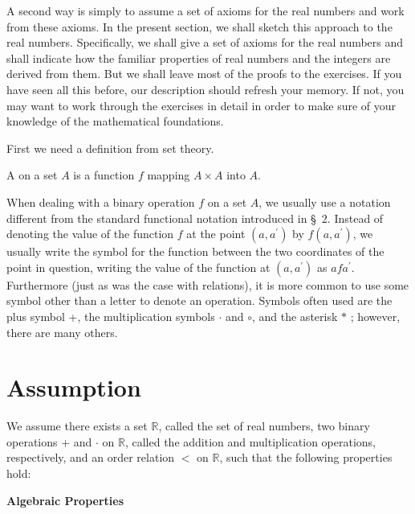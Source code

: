 A second way is simply to assume a set of axioms for the real numbers and 
work from these axioms. In the present section, we shall sketch this approach 
to the real numbers. Specifically, we shall give a set of axioms for the real 
numbers and shall indicate how the familiar properties of real numbers 
and the integers are derived from them. But we shall leave most of the proofs 
to the exercises. If you have seen all this before, our description should 
refresh your memory. If not, you may want to work through the exercises in 
detail in order to make sure of your knowledge of the mathematical foundations.

First we need a definition from set theory.

\begin{definition}
 A  on a set \(A\) is a function \(f\) mapping \(A \times A\) into \(A\).
\end{definition}

When dealing with a binary operation \(f\) on a set \(A\), 
we usually use a notation different from the standard functional notation 
introduced in \S\ 2. Instead of denoting the value of the function \(f\) 
at the point \(({a,a^{\prime }})\) by \(f({a,a^{\prime }})\), 
we usually write the symbol for the function between the two coordinates 
of the point in question, writing the value of the function at 
\(({a,a^{\prime }})\) as \({af}a^{\prime }\). 
Furthermore (just as was the case with relations), it is more common to use 
some symbol other than a letter to denote an operation. Symbols often used
are the plus symbol +, the multiplication symbols \(\cdot\) and \(\circ\), 
and the asterisk \(*\) ; however, there are many others.

\section*{Assumption}

We assume there exists a set \(\mathbb{R}\), called the set of real numbers, 
two binary operations + and \(\cdot\) on \(\mathbb{R}\), called the addition 
and multiplication operations, respectively, and an order relation \(<\) on 
\(\mathbb{R}\), such that the following properties hold:

\noindent\textbf{Algebraic Properties}

